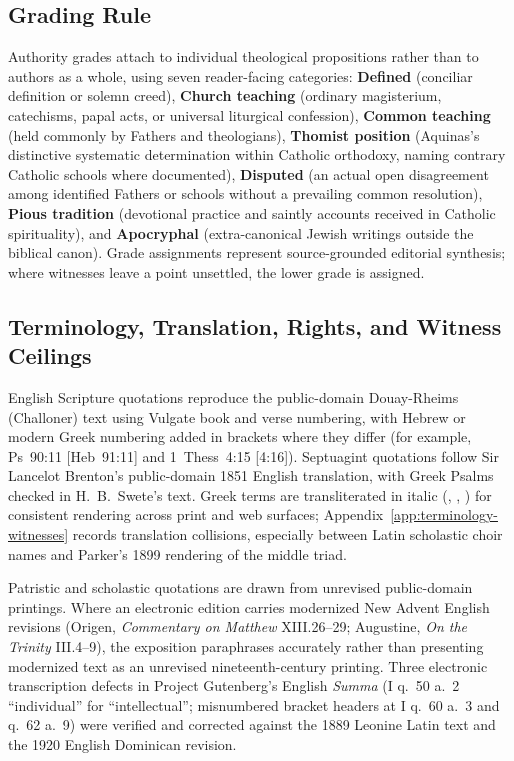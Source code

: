 \subsection{Grading Rule}

Authority grades attach to individual theological propositions rather than to authors as a whole, using seven reader-facing categories: \textbf{Defined} (conciliar definition or solemn creed), \textbf{Church teaching} (ordinary magisterium, catechisms, papal acts, or universal liturgical confession), \textbf{Common teaching} (held commonly by Fathers and theologians), \textbf{Thomist position} (Aquinas's distinctive systematic determination within Catholic orthodoxy, naming contrary Catholic schools where documented), \textbf{Disputed} (an actual open disagreement among identified Fathers or schools without a prevailing common resolution), \textbf{Pious tradition} (devotional practice and saintly accounts received in Catholic spirituality), and \textbf{Apocryphal} (extra-canonical Jewish writings outside the biblical canon). Grade assignments represent source-grounded editorial synthesis; where witnesses leave a point unsettled, the lower grade is assigned.

\subsection{Terminology, Translation, Rights, and Witness Ceilings}

English Scripture quotations reproduce the public-domain Douay-Rheims (Challoner) text using Vulgate book and verse numbering, with Hebrew or modern Greek numbering added in brackets where they differ (for example, Ps~90:11 [Heb~91:11] and 1~Thess~4:15 [4:16]). Septuagint quotations follow Sir Lancelot Brenton's public-domain 1851 English translation, with Greek Psalms checked in H.~B.~Swete's text. Greek terms are transliterated in italic (, , ) for consistent rendering across print and web surfaces; Appendix~\ref{app:terminology-witnesses} records translation collisions, especially between Latin scholastic choir names and Parker's 1899 rendering of the middle triad.

Patristic and scholastic quotations are drawn from unrevised public-domain printings. Where an electronic edition carries modernized New Advent English revisions (Origen, \emph{Commentary on Matthew} XIII.26--29; Augustine, \emph{On the Trinity} III.4--9), the exposition paraphrases accurately rather than presenting modernized text as an unrevised nineteenth-century printing. Three electronic transcription defects in Project Gutenberg's English \emph{Summa} (I q.~50 a.~2 ``individual'' for ``intellectual''; misnumbered bracket headers at I q.~60 a.~3 and q.~62 a.~9) were verified and corrected against the 1889 Leonine Latin text and the 1920 English Dominican revision.

